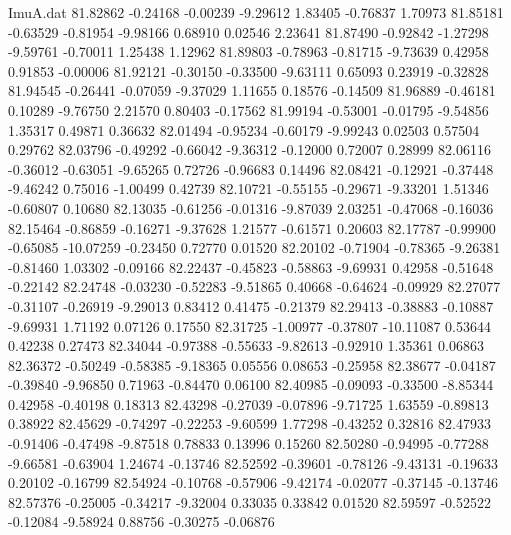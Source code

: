 \begin{filecontents}{ImuA.dat}
  81.82862   -0.24168   -0.00239   -9.29612    1.83405   -0.76837    1.70973
  81.85181   -0.63529   -0.81954   -9.98166    0.68910    0.02546    2.23641
  81.87490   -0.92842   -1.27298   -9.59761   -0.70011    1.25438    1.12962
  81.89803   -0.78963   -0.81715   -9.73639    0.42958    0.91853   -0.00006
  81.92121   -0.30150   -0.33500   -9.63111    0.65093    0.23919   -0.32828
  81.94545   -0.26441   -0.07059   -9.37029    1.11655    0.18576   -0.14509
  81.96889   -0.46181    0.10289   -9.76750    2.21570    0.80403   -0.17562
  81.99194   -0.53001   -0.01795   -9.54856    1.35317    0.49871    0.36632
  82.01494   -0.95234   -0.60179   -9.99243    0.02503    0.57504    0.29762
  82.03796   -0.49292   -0.66042   -9.36312   -0.12000    0.72007    0.28999
  82.06116   -0.36012   -0.63051   -9.65265    0.72726   -0.96683    0.14496
  82.08421   -0.12921   -0.37448   -9.46242    0.75016   -1.00499    0.42739
  82.10721   -0.55155   -0.29671   -9.33201    1.51346   -0.60807    0.10680
  82.13035   -0.61256   -0.01316   -9.87039    2.03251   -0.47068   -0.16036
  82.15464   -0.86859   -0.16271   -9.37628    1.21577   -0.61571    0.20603
  82.17787   -0.99900   -0.65085  -10.07259   -0.23450    0.72770    0.01520
  82.20102   -0.71904   -0.78365   -9.26381   -0.81460    1.03302   -0.09166
  82.22437   -0.45823   -0.58863   -9.69931    0.42958   -0.51648   -0.22142
  82.24748   -0.03230   -0.52283   -9.51865    0.40668   -0.64624   -0.09929
  82.27077   -0.31107   -0.26919   -9.29013    0.83412    0.41475   -0.21379
  82.29413   -0.38883   -0.10887   -9.69931    1.71192    0.07126    0.17550
  82.31725   -1.00977   -0.37807  -10.11087    0.53644    0.42238    0.27473
  82.34044   -0.97388   -0.55633   -9.82613   -0.92910    1.35361    0.06863
  82.36372   -0.50249   -0.58385   -9.18365    0.05556    0.08653   -0.25958
  82.38677   -0.04187   -0.39840   -9.96850    0.71963   -0.84470    0.06100
  82.40985   -0.09093   -0.33500   -8.85344    0.42958   -0.40198    0.18313
  82.43298   -0.27039   -0.07896   -9.71725    1.63559   -0.89813    0.38922
  82.45629   -0.74297   -0.22253   -9.60599    1.77298   -0.43252    0.32816
  82.47933   -0.91406   -0.47498   -9.87518    0.78833    0.13996    0.15260
  82.50280   -0.94995   -0.77288   -9.66581   -0.63904    1.24674   -0.13746
  82.52592   -0.39601   -0.78126   -9.43131   -0.19633    0.20102   -0.16799
  82.54924   -0.10768   -0.57906   -9.42174   -0.02077   -0.37145   -0.13746
  82.57376   -0.25005   -0.34217   -9.32004    0.33035    0.33842    0.01520
  82.59597   -0.52522   -0.12084   -9.58924    0.88756   -0.30275   -0.06876

\end{filecontents}
